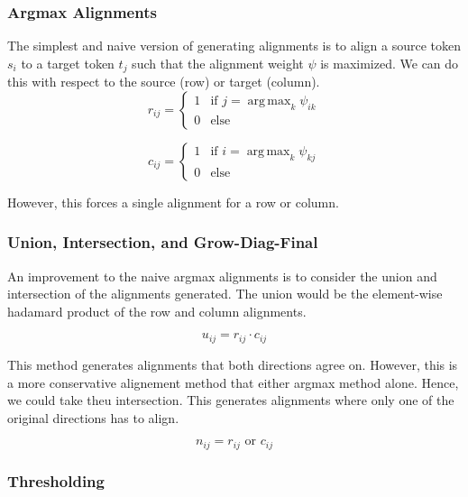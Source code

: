 \documentclass[twoside,twocolumn]{article}
\DeclareMathOperator*{\argmax}{arg\,max}
\begin{document}
\subsubsection{Argmax Alignments}
The simplest and naive version of generating alignments is to
align a source token $s_i$ to a target token $t_j$ such that the
alignment weight $\psi$ is maximized. We can do this with respect
to the source (row) or target (column).
\begin{equation}
  r_{ij} = \begin{cases}
    1 & \text{if } j=\argmax_k \psi_{ik} \\
    0 & \text{else}
  \end{cases}
\end{equation}

\begin{equation}
  c_{ij} = \begin{cases}
    1 & \text{if } i=\argmax_k \psi_{kj} \\
    0 & \text{else}
  \end{cases}
\end{equation}

However, this forces a single alignment for a row or column.

\subsubsection{Union, Intersection, and Grow-Diag-Final}

An improvement to the naive argmax alignments is to consider the
union and intersection of the alignments generated. The union would
be the element-wise hadamard product of the row and column alignments.

\begin{equation}
  u_{ij} = r_{ij} \cdot c_{ij}
\end{equation}

This method generates alignments that both directions agree on.
However, this is a more conservative alignement method that either
argmax method alone. Hence, we could take theu intersection.
This generates alignments where only one of the original directions
has to align.

\begin{equation}
  n_{ij} = r_{ij} \text{ or } c_{ij}
\end{equation}



\subsubsection{Thresholding}
\end{document}
